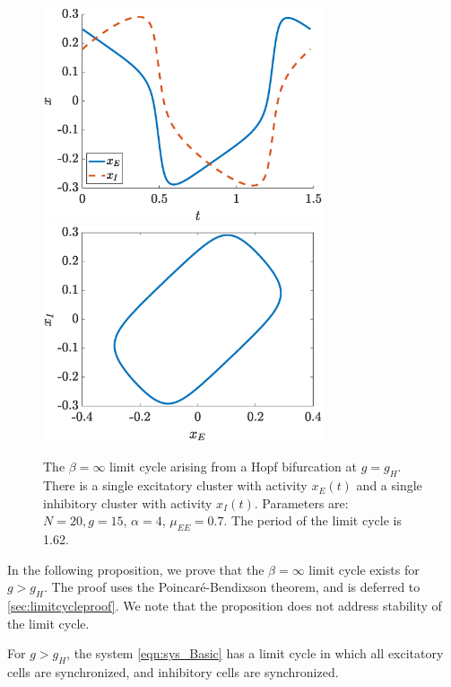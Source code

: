 \documentclass[reqno]{siamonline190516}
\begin{document}
\begin{figure}
    \centering
    \includegraphics[width=8.25cm]{limitcycle1.eps}\hspace{-0.5cm}
    \includegraphics[width=8.25cm]{limitcycle2.eps}
    \caption{The $\beta = \infty$ limit cycle arising from a Hopf bifurcation at $g = g_H$. There is a single excitatory cluster with activity $x_E(t)$ and a single inhibitory cluster with activity $x_I(t)$. Parameters are: $N=20, g = 15$, $\alpha = 4$, $\mu_{EE}= 0.7$. The period of the limit cycle is 1.62.} 
    \label{fig:limitcycleorigin}
\end{figure}

In the following proposition, we prove that the $\beta=\infty$ limit cycle exists for $g > g_H$. The proof uses the Poincar\'e-Bendixson theorem, and is deferred to \cref{sec:limitcycleproof}. We note that the proposition does not address stability of the limit cycle.

\begin{proposition}\label{prop:limitcycle}
For $g > g_H$, the system \cref{eqn:sys_Basic} has a limit cycle in which all excitatory cells are synchronized, and inhibitory cells are synchronized.
\end{proposition}
\end{document}
